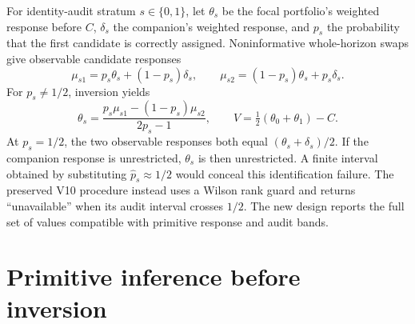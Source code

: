 For identity-audit stratum $s\in\{0,1\}$, let $\theta_s$ be the focal
portfolio's weighted response before $C$, $\delta_s$ the companion's weighted
response, and $p_s$ the probability that the first candidate is correctly
assigned. Noninformative whole-horizon swaps give observable candidate
responses
\begin{equation}\label{integrated:weak_audit_projection:eq:mixture}
 \mu_{s1}=p_s\theta_s+(1-p_s)\delta_s,\qquad
 \mu_{s2}=(1-p_s)\theta_s+p_s\delta_s.
\end{equation}
For $p_s\ne 1/2$, inversion yields
\begin{equation}\label{integrated:weak_audit_projection:eq:inverse}
 \theta_s=\frac{p_s\mu_{s1}-(1-p_s)\mu_{s2}}{2p_s-1},\qquad
 V=\tfrac12(\theta_0+\theta_1)-C.
\end{equation}
At $p_s=1/2$, the two observable responses both equal
$(\theta_s+\delta_s)/2$. If the companion response is unrestricted,
$\theta_s$ is then unrestricted. A finite interval obtained by substituting
$\widehat p_s\approx1/2$ would conceal this identification failure. The
preserved V10 procedure instead uses a Wilson rank guard and returns
``unavailable'' when its audit interval crosses $1/2$. The new design reports
the full set of values compatible with primitive response and audit bands.

\section{Primitive inference before inversion}

